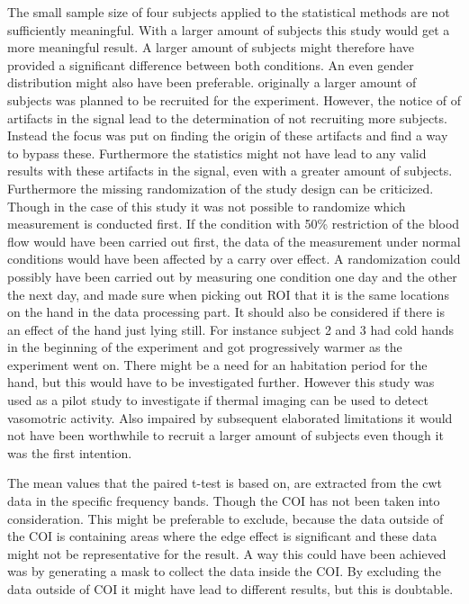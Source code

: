 The small sample size of four subjects applied to the statistical methods are not sufficiently meaningful. With a larger amount of subjects this study would get a more meaningful result. A larger amount of subjects might therefore have provided a significant difference between both conditions. An even gender distribution might also have been preferable. %
originally a larger amount of subjects was planned to be recruited for the experiment. However, the notice of  of artifacts in the signal lead to the determination of not recruiting more subjects. Instead the focus was put on finding the origin of these artifacts and find a way to bypass these. Furthermore the statistics might not have lead to any valid results with these artifacts in the signal, even with a greater amount of subjects.
Furthermore the missing randomization of the study design can be criticized. Though in the case of this study it was not possible to randomize which measurement is conducted first. If the condition with 50\% restriction of the blood flow would have been carried out first, the data of the measurement under normal conditions would have been affected by a carry over effect. A randomization could possibly have been carried out by measuring one condition one day and the other the next day, and made sure when picking out ROI that it is the same locations on the hand in the data processing part. It should also be considered if there is an effect of the hand just lying still. For instance subject 2 and 3 had cold hands in the beginning of the experiment and got progressively warmer as the experiment went on. There might be a need for an habitation period for the hand, but this would have to be investigated further. 
However this study was used as a pilot study to investigate if thermal imaging can be used to detect vasomotric activity. Also impaired by subsequent elaborated limitations it would not have been worthwhile to recruit a larger amount of subjects even though it was the first intention.

The mean values that the paired t-test is based on, are extracted from the cwt data in the specific frequency bands. Though the COI has not been taken into consideration. This might be preferable to exclude, because the data outside of the COI is containing areas where the edge effect is significant and these data might not be representative for the result. A way this could have been achieved was by generating a mask to collect the data inside the COI. By excluding the data outside of COI it might have lead to different results, but this is doubtable. 

